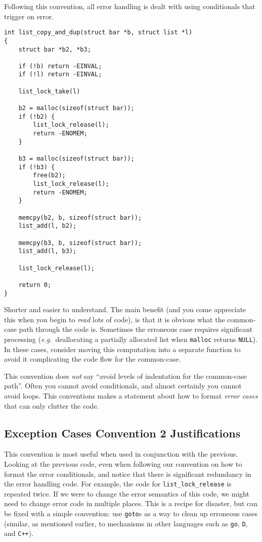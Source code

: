 \documentclass[11pt,onecolumn]{article}
\def\eg{\textit{e.g.}}
\begin{document}
Following this convention, all error handling is dealt with using
conditionals that trigger on error.

    \begin{minipage}{3in}
      \footnotesize
      \lstset{language=C}
      \begin{lstlisting}
int list_copy_and_dup(struct bar *b, struct list *l)
{
    struct bar *b2, *b3;

    if (!b) return -EINVAL;
    if (!l) return -EINVAL;

    list_lock_take(l)

    b2 = malloc(sizeof(struct bar));
    if (!b2) {
        list_lock_release(l);
        return -ENOMEM;
    }

    b3 = malloc(sizeof(struct bar));
    if (!b3) {
        free(b2);
        list_lock_release(l);
        return -ENOMEM;
    }

    memcpy(b2, b, sizeof(struct bar));
    list_add(l, b2);

    memcpy(b3, b, sizeof(struct bar));
    list_add(l, b3);

    list_lock_release(l);

    return 0;
}
      \end{lstlisting}
    \end{minipage}

Shorter and easier to understand.  The main benefit (and you come
appreciate this when you begin to {\em read} lots of code), is that it
is obvious what the common-case path through the code is.  Sometimes
the erroneous case requires significant processing (\eg\ deallocating
a partially allocated list when {\tt malloc} returns {\tt NULL}).  In
these cases, consider moving this computation into a separate function
to avoid it complicating the code flow for the common-case.

This convention does {\em not} say ``avoid levels of indentation for
the common-case path''.  Often you cannot avoid conditionals, and
almost certainly you cannot avoid loops.  This conventions makes a
statement about how to format {\em error cases} that can only clutter
the code.

\subsection{Exception Cases Convention 2 Justifications}

This convention is most useful when used in conjunction with the
previous.  Looking at the previous code, even when following our
convention on how to format the error conditionals, and notice that
there is significant redundancy in the error handling code.  For
example, the code for {\tt list\_lock\_release} is repeated twice.  If
we were to change the error semantics of this code, we might need to
change error code in multiple places.  This is a recipe for disaster,
but can be fixed with a simple convention: use {\tt goto}s as a way to
clean up erroneous cases (similar, as mentioned earlier, to mechanisms
in other languages such as {\tt go}, {\tt D}, and {\tt C++}).
\end{document}
